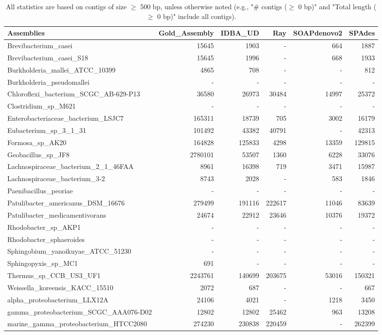 \documentclass[12pt,a4paper]{article}
\begin{document}
\begin{table}[ht]
\begin{center}
\caption{All statistics are based on contigs of size $\geq$ 500 bp, unless otherwise noted (e.g., "\# contigs ($\geq$ 0 bp)" and "Total length ($\geq$ 0 bp)" include all contigs).}
\begin{tabular}{|l*{5}{|r}|}
\hline
Assemblies & Gold\_Assembly & IDBA\_UD & Ray & SOAPdenovo2 & SPAdes \\ \hline
Brevibacterium\_casei & 15645 & 1903 & - & 664 & 1887 \\ \hline
Brevibacterium\_casei\_S18 & 15645 & 1996 & - & 668 & 1933 \\ \hline
Burkholderia\_mallei\_ATCC\_10399 & 4865 & 708 & - & - & 812 \\ \hline
Burkholderia\_pseudomallei & - & - & - & - & - \\ \hline
Chloroflexi\_bacterium\_SCGC\_AB-629-P13 & 36580 & 26973 & 30484 & 14997 & 25372 \\ \hline
Clostridium\_sp\_M621 & - & - & - & - & - \\ \hline
Enterobacteriaceae\_bacterium\_LSJC7 & 165311 & 18739 & 705 & 3002 & 16179 \\ \hline
Eubacterium\_sp\_3\_1\_31 & 101492 & 43382 & 40791 & - & 42313 \\ \hline
Formosa\_sp\_AK20 & 164828 & 125833 & 4298 & 13359 & 129815 \\ \hline
Geobacillus\_sp\_JF8 & 2780101 & 53507 & 1360 & 6228 & 33076 \\ \hline
Lachnospiraceae\_bacterium\_2\_1\_46FAA & 8961 & 16398 & 719 & 3471 & 15987 \\ \hline
Lachnospiraceae\_bacterium\_3-2 & 8743 & 2028 & - & 583 & 1846 \\ \hline
Paenibacillus\_peoriae & - & - & - & - & - \\ \hline
Patulibacter\_americanus\_DSM\_16676 & 279499 & 191116 & 222617 & 11046 & 83639 \\ \hline
Patulibacter\_medicamentivorans & 24674 & 22912 & 23646 & 10376 & 19372 \\ \hline
Rhodobacter\_sp\_AKP1 & - & - & - & - & - \\ \hline
Rhodobacter\_sphaeroides & - & - & - & - & - \\ \hline
Sphingobium\_yanoikuyae\_ATCC\_51230 & - & - & - & - & - \\ \hline
Sphingopyxis\_sp\_MC1 & 691 & - & - & - & - \\ \hline
Thermus\_sp\_CCB\_US3\_UF1 & 2243761 & 140699 & 203675 & 53016 & 150321 \\ \hline
Weissella\_koreensis\_KACC\_15510 & 2072 & 687 & - & - & 667 \\ \hline
alpha\_proteobacterium\_LLX12A & 24106 & 4021 & - & 1218 & 3450 \\ \hline
gamma\_proteobacterium\_SCGC\_AAA076-D02 & 12802 & 12802 & 25462 & 963 & 13208 \\ \hline
marine\_gamma\_proteobacterium\_HTCC2080 & 274230 & 230838 & 220459 & - & 262399 \\ \hline
\end{tabular}
\end{center}
\end{table}
\end{document}
